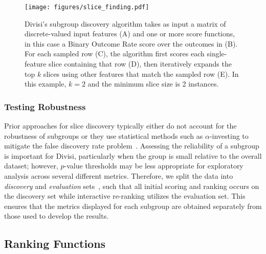 \begin{figure*}
    \centering
    \texttt{[image: figures/slice\_finding.pdf]}
    \caption{Divisi's subgroup discovery algorithm takes as input a matrix of discrete-valued input features (A) and one or more score functions, in this case a Binary Outcome Rate score over the outcomes in (B). For each sampled row (C), the algorithm first scores each single-feature slice containing that row (D), then iteratively expands the top $k$ slices using other features that match the sampled row (E). In this example, $k = 2$ and the minimum slice size is 2 instances.}
    \label{fig:slice-finding}
\end{figure*}

\subsubsection{Testing Robustness} \label{sec:testing-robustness}
Prior approaches for slice discovery typically either do not account for the robustness of subgroups or they use statistical methods such as $\alpha$-investing to mitigate the false discovery rate problem~\cite{chung_slice_2020,pastor_looking_2021}. Assessing the reliability of a subgroup is important for Divisi, particularly when the group is small relative to the overall dataset; however, $p$-value thresholds may be less appropriate for exploratory analysis across several different metrics. Therefore, we split the data into \textit{discovery} and \textit{evaluation} sets~\cite{green_subgroup_2021}, such that all initial scoring and ranking occurs on the discovery set while interactive re-ranking utilizes the evaluation set. This ensures that the metrics displayed for each subgroup are obtained separately from those used to develop the results.

\subsection{Ranking Functions}

